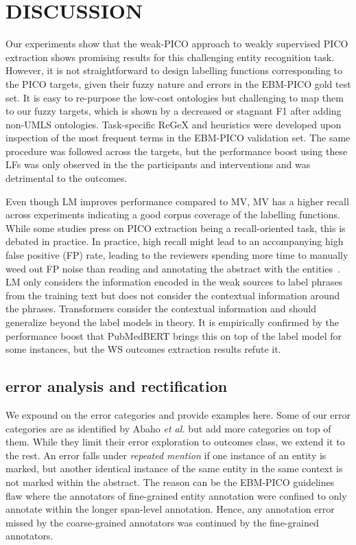 \documentclass[10.7pt,]{article}
\begin{document}
\section{DISCUSSION}\label{discussion}
%
Our experiments show that the weak-PICO approach to weakly supervised PICO extraction shows promising results for this challenging entity recognition task.
However, it is not straightforward to design labelling functions corresponding to the PICO targets, given their fuzzy nature and errors in the EBM-PICO gold test set.
It is easy to re-purpose the low-cost ontologies but challenging to map them to our fuzzy targets, which is shown by a decreased or stagnant F1 after adding non-UMLS ontologies.
Task-specific ReGeX and heuristics were developed upon inspection of the most frequent terms in the EBM-PICO validation set.
The same procedure was followed across the targets, but the performance boost using these LFs was only observed in the the participants and interventions and was detrimental to the outcomes.

Even though LM improves performance compared to MV, MV has a higher recall across experiments indicating a good corpus coverage of the labelling functions.
While some studies press on PICO extraction being a recall-oriented task, this is debated in practice.
In practice, high recall might lead to an accompanying high false positive (FP) rate, leading to the reviewers spending more time to manually weed out FP noise than reading and annotating the abstract with the entities~\cite{liu2021sent2span}.
LM only considers the information encoded in the weak sources to label phrases from the training text but does not consider the contextual information around the phrases.
Transformers consider the contextual information and should generalize beyond the label models in theory.
It is empirically confirmed by the performance boost that PubMedBERT brings this on top of the label model for some instances, but the WS outcomes extraction results refute it.
%
\subsection{error analysis and rectification}\label{err_ana}
%
We expound on the error categories and provide examples here.
Some of our error categories are as identified by Abaho \textit{et al.} but add more categories on top of them.
While they limit their error exploration to outcomes class, we extend it to the rest.
An error falls under \textit{repeated mention} if one instance of an entity is marked, but another identical instance of the same entity in the same context is not marked within the abstract. 
The reason can be the EBM-PICO guidelines flaw where the annotators of fine-grained entity annotation were confined to only annotate within the longer span-level annotation.
Hence, any annotation error missed by the coarse-grained annotators was continued by the fine-grained annotators.
\end{document}
